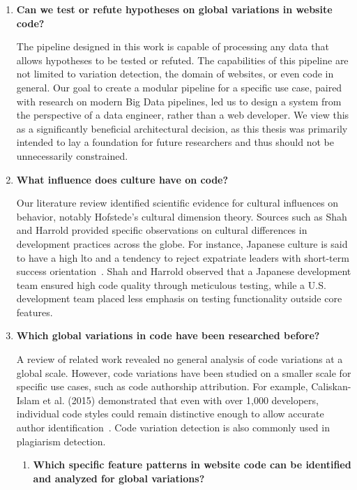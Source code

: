 \begin{enumerate}
    \item[] \textbf{ Can we test or refute hypotheses on global variations in website code?}

    The pipeline designed in this work is capable of processing any data that allows hypotheses to be tested or refuted.
    The capabilities of this pipeline are not limited to variation detection, the domain of websites, or even code in general.
    Our goal to create a modular pipeline for a specific use case, paired with research on modern Big Data pipelines, led us to design a system from the perspective of a data engineer, rather than a web developer.
    We view this as a significantly beneficial architectural decision, as this thesis was primarily intended to lay a foundation for future researchers and thus should not be unnecessarily constrained.

    \item[] \textbf{ What influence does culture have on code?}

    Our literature review identified scientific evidence for cultural influences on behavior, notably Hofstede's cultural dimension theory.
    Sources such as Shah and Harrold provided specific observations on cultural differences in development practices across the globe.
    For instance, Japanese culture is said to have a high \ac{lto} and a tendency to reject expatriate leaders with short-term success orientation~\cite{CFG2024, Marshall}.
    Shah and Harrold observed that a Japanese development team ensured high code quality through meticulous testing, while a U.S. development team placed less emphasis on testing functionality outside core features.

    \item[] \textbf{ Which global variations in code have been researched before?}

    A review of related work revealed no general analysis of code variations at a global scale.
    However, code variations have been studied on a smaller scale for specific use cases, such as code authorship attribution.
    For example, Caliskan-Islam et al. (2015) demonstrated that even with over 1,000 developers, individual code styles could remain distinctive enough to allow accurate author identification~\cite{CaliskanIslam2015}.
    Code variation detection is also commonly used in plagiarism detection.

    \begin{enumerate}
        \item[] \textbf{ Which specific feature patterns in website code can be identified and analyzed for global variations?}


\end{enumerate}
\end{enumerate}
